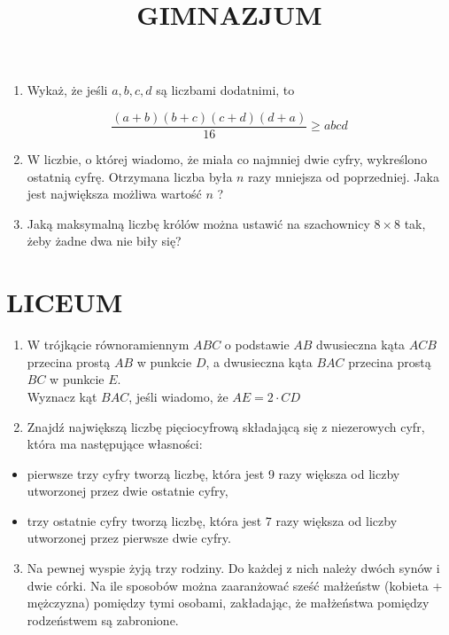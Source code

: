 \documentclass[10pt]{article}
\title{GIMNAZJUM }
\author{}
\date{}
\begin{document}
\maketitle
\begin{enumerate}
  \item Wykaż, że jeśli \(a, b, c, d\) są liczbami dodatnimi, to
\end{enumerate}

\[
\frac{(a+b)(b+c)(c+d)(d+a)}{16} \geq a b c d
\]

\begin{enumerate}
  \setcounter{enumi}{1}
  \item W liczbie, o której wiadomo, że miała co najmniej dwie cyfry, wykreślono ostatnią cyfrę. Otrzymana liczba była \(n\) razy mniejsza od poprzedniej. Jaka jest największa możliwa wartość \(n\) ?
  \item Jaką maksymalną liczbę królów można ustawić na szachownicy \(8 \times 8\) tak, żeby żadne dwa nie biły się?
\end{enumerate}

\section*{LICEUM}
\begin{enumerate}
  \item W trójkącie równoramiennym \(A B C\) o podstawie \(A B\) dwusieczna kąta \(A C B\) przecina prostą \(A B\) w punkcie \(D\), a dwusieczna kąta \(B A C\) przecina prostą \(B C\) w punkcie \(E\).\\
Wyznacz kąt \(B A C\), jeśli wiadomo, że \(A E=2 \cdot C D\)
  \item Znajdź największą liczbę pięciocyfrową składającą się z niezerowych cyfr, która ma następujące własności:
\end{enumerate}

\begin{itemize}
  \item pierwsze trzy cyfry tworzą liczbę, która jest 9 razy większa od liczby utworzonej przez dwie ostatnie cyfry,
  \item trzy ostatnie cyfry tworzą liczbę, która jest 7 razy większa od liczby utworzonej przez pierwsze dwie cyfry.
\end{itemize}

\begin{enumerate}
  \setcounter{enumi}{2}
  \item Na pewnej wyspie żyją trzy rodziny. Do każdej z nich należy dwóch synów i dwie córki. Na ile sposobów można zaaranżować sześć małżeństw (kobieta + mężczyzna) pomiędzy tymi osobami, zakładając, że małżeństwa pomiędzy rodzeństwem są zabronione.
\end{enumerate}
\end{document}
